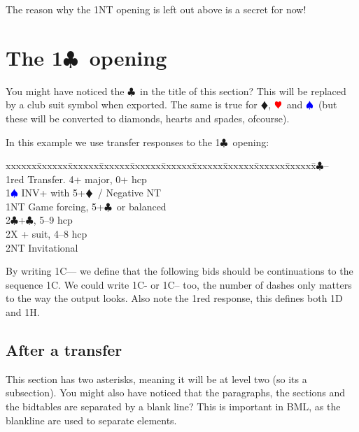 \documentclass[a4paper]{article}
\newcommand{\BC}{\textcolor{OliveGreen}{$\clubsuit$}}
\newcommand{\BD}{\textcolor{RedOrange}{$\vardiamondsuit$}}
\newcommand{\BH}{\textcolor{Red}{$\varheartsuit${}}}
\newcommand{\BS}{\textcolor{Blue}{$\spadesuit${}}}
\newcommand{\pdfc}{\texorpdfstring{\BC{}}{C}}
\newenvironment{bidtable}
{\begin{tabbing}

xxxxxx\=xxxxxx\=xxxxxx\=xxxxxx\=xxxxxx\=xxxxxx\=xxxxxx\=xxxxxx\=xxxxxx\=xxxxxx\=\kill}
{\end{tabbing} }%
\begin{document}
The reason why the 1NT opening is left out above is a secret for
now!

\section{The 1\pdfc\ opening}

You might have noticed the \BC\ in the title of this section? This
will be replaced by a club suit symbol when exported. The same is
true for \BD , \BH\ and \BS\ (but these will be converted to diamonds,
hearts and spades, ofcourse).

In this example we use transfer responses to the 1\BC\ opening:

\begin{bidtable}
1\BC--\+\\
1red \> Transfer. 4+ major, 0+ hcp\\
1\BS \> INV+ with 5+\BD\ / Negative NT\\
1NT \> Game forcing, 5+\BC\ or balanced\\
2\BC {}+\BC , 5--9 hcp\\
2X + suit, 4--8 hcp\\
2NT \> Invitational\-
\end{bidtable}

By writing 1C--- we define that the following bids should be
continuations to the sequence 1C. We could write 1C- or 1C-- too,
the number of dashes only matters to the way the output looks. Also
note the 1red response, this defines both 1D and 1H.

\subsection{After a transfer}

This section has two asterisks, meaning it will be at level two
(so its a subsection). You might also have noticed that the
paragraphs, the sections and the bidtables are separated by a
blank line? This is important in BML, as the blankline are used to
separate elements.
\end{document}

